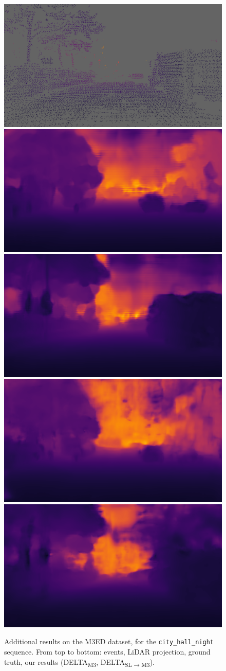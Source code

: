 \begin{figure}
  \includegraphics[width=0.4325\linewidth]{mainmatter/figures/c_depth_transf/m3ed_dense_cmp_additional/gtbf005472_lightgray_fixed.png}\\
  \includegraphics[width=0.4325\linewidth]{mainmatter/figures/c_depth_transf/m3ed_dense_cmp_additional/predbf002995_m3.png}
  \includegraphics[width=0.4325\linewidth]{mainmatter/figures/c_depth_transf/m3ed_dense_cmp_additional/predbf005472_m3.png}\\
  \includegraphics[width=0.4325\linewidth]{mainmatter/figures/c_depth_transf/m3ed_dense_cmp_additional/predbf002995_sl_m3.png}
  \includegraphics[width=0.4325\linewidth]{mainmatter/figures/c_depth_transf/m3ed_dense_cmp_additional/predbf005472_sl_m3.png}
  \cprotect\caption{Additional results on the M3ED dataset, for the \verb|city_hall_night| sequence. From top to bottom: events, LiDAR projection, ground truth, our results (DELTA\textsubscript{M3}, DELTA\textsubscript{SL\(\rightarrow\)M3}).}\label{fig:appendix:delta:cmp_m3ed_additional_night}
\end{figure}
